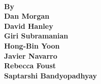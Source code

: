 \vspace*{4cm}
\begin{center}
{\bf 
{\fontsize{50cm}{25pt}} \\
\vspace{0.5cm}
{\large By}\\
\vspace{0.5cm}
{\Large Dan Morgan \\
David Hanley \\
Giri Subramanian \\
Hong-Bin Yoon \\
Javier Navarro \\
Rebecca Foust \\
Saptarshi Bandyopadhyay }
}
\end{center}

